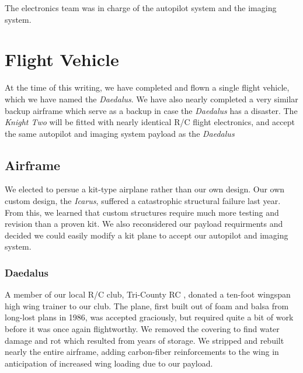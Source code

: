 \documentclass[10pt]{report}
\begin{document}


The electronics team was in charge of the autopilot system and the imaging system. 

\section{Flight Vehicle}

At the time of this writing, we have completed and flown a single flight vehicle, which we have named the \emph{Daedalus}.
We have also nearly completed a very similar backup airframe which serve as a backup in case the \emph{Daedalus} has a disaster. The \emph{Knight Two} will be fitted with nearly identical R/C flight electronics, and accept the same autopilot and imaging system payload as the \emph{Daedalus}

\subsection{Airframe}

We elected to persue a kit-type airplane rather than our own design. 
Our own custom design, the \emph{Icarus}, suffered a catastrophic structural failure last year. From this, we learned that custom structures require much more testing and revision than a proven kit. We also reconsidered our payload requirments and decided we could easily modify a kit plane to accept our autopilot and imaging system.

\subsubsection{Daedalus}

A member of our local R/C club, Tri-County RC \cite{tricountyRC}, donated a ten-foot wingspan high wing trainer to our club. The plane, first built out of foam and balsa from long-lost plans in 1986, was accepted graciously, but required quite a bit of work before it was once again flightworthy. We removed the covering to find water damage and rot which resulted from years of storage. We stripped and rebuilt nearly the entire airframe, adding carbon-fiber reinforcements to the wing in anticipation of increased wing loading due to our payload.
\end{document}
